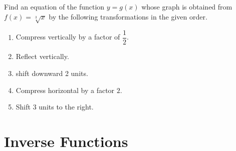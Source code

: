 \begin{exercise}
  Find an equation of the function $y=g(x)$ whose graph is obtained from $f(x)=\sqrt[3]{x}$ by the following transformations in the given order.
  \begin{enumerate}
    \item Compress vertically by a factor of $\dfrac{1}{2}$.
    \item Reflect vertically.
    \item shift downward 2 units.
    \item Compress horizontal by a factor $2$.
    \item Shift 3 units to the right.
  \end{enumerate}
\end{exercise}

\newpage

\section{Inverse Functions}


